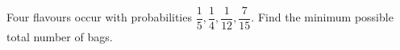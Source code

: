 Four flavours occur with probabilities $\dfrac{1}{5},\dfrac{1}{4},\dfrac{1}{12},\dfrac{7}{15}$. Find the minimum possible total number of bags.
